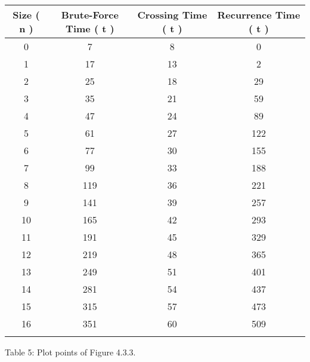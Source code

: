 \begin{center} 
\begin{tabular}[.5cm]{ c c c c } 
\toprule 
\hspace{10pt} Size ( n ) \hspace{10pt} & \hspace{10pt} Brute-Force Time ( t ) \hspace{10pt} & \hspace{10pt} Crossing Time ( t ) \hspace{10pt} & \hspace{10pt} Recurrence Time ( t ) \\ 
\midrule 
0 & 7 & 8 & 0 \\ 
\cmidrule {1-4} 
1 & 17 & 13 & 2 \\ 
\cmidrule {1-4} 
2 & 25 & 18 & 29 \\ 
\cmidrule {1-4} 
3 & 35 & 21 & 59 \\ 
\cmidrule {1-4} 
4 & 47 & 24 & 89 \\ 
\cmidrule {1-4} 
5 & 61 & 27 & 122 \\ 
\cmidrule {1-4} 
6 & 77 & 30 & 155 \\ 
\cmidrule {1-4} 
7 & 99 & 33 & 188 \\ 
\cmidrule {1-4} 
8 & 119 & 36 & 221 \\ 
\cmidrule {1-4} 
9 & 141 & 39 & 257 \\ 
\cmidrule {1-4} 
10 & 165 & 42 & 293 \\ 
\cmidrule {1-4} 
11 & 191 & 45 & 329 \\ 
\cmidrule {1-4} 
12 & 219 & 48 & 365 \\ 
\cmidrule {1-4} 
13 & 249 & 51 & 401 \\ 
\cmidrule {1-4} 
14 & 281 & 54 & 437 \\ 
\cmidrule {1-4} 
15 & 315 & 57 & 473 \\ 
\cmidrule {1-4} 
16 & 351 & 60 & 509 \\ 
\bottomrule 
\linebreak 
\end{tabular}  
\linebreak \linebreak Table 5: Plot points of Figure 4.3.3.
\end{center} \hfill 

\pagebreak
